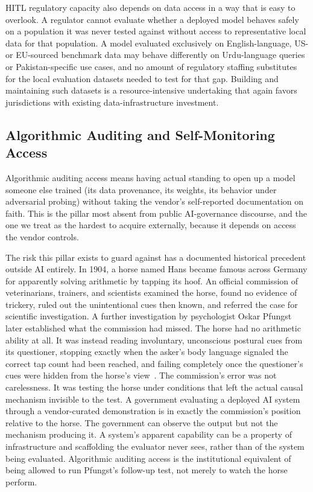 \documentclass{ieeeaccess}
\begin{document}
HITL regulatory capacity also depends on data access in a way that is easy to overlook. A regulator cannot evaluate whether a deployed model behaves safely on a population it was never tested against without access to representative local data for that population. A model evaluated exclusively on English-language, US- or EU-sourced benchmark data may behave differently on Urdu-language queries or Pakistan-specific use cases, and no amount of regulatory staffing substitutes for the local evaluation datasets needed to test for that gap.
Building and maintaining such datasets is a resource-intensive undertaking that again favors jurisdictions with existing data-infrastructure investment.

\subsection{Algorithmic Auditing and Self-Monitoring Access}

Algorithmic auditing access means having actual standing to open up a model someone else trained (its data provenance, its weights, its behavior under adversarial probing) without taking the vendor's self-reported documentation on faith. This is the pillar most absent from public AI-governance discourse, and the one we treat as the hardest to acquire externally, because it depends on access the vendor controls.

The risk this pillar exists to guard against has a documented historical precedent outside AI entirely. In 1904, a horse named Hans became famous across Germany for apparently solving arithmetic by tapping its hoof. An official commission of veterinarians, trainers, and scientists examined the horse, found no evidence of trickery, ruled out the unintentional cues then known, and referred the case for scientific investigation. A further investigation by psychologist Oskar Pfungst later established what the commission had missed. The horse had no arithmetic ability at all. It was instead reading involuntary, unconscious postural cues from its questioner, stopping exactly when the asker's body language signaled the correct tap count had been reached, and failing completely once the questioner's cues were hidden from the horse's view~\cite{pfungst1911cleverhans}.
The commission's error was not carelessness. It was testing the horse under conditions that left the actual causal mechanism invisible to the test. A government evaluating a deployed AI system through a vendor-curated demonstration is in exactly the commission's position relative to the horse. The government can observe the output but not the mechanism producing it. A system's apparent capability can be a property of infrastructure and scaffolding the evaluator never sees, rather than of the system being evaluated. Algorithmic auditing access is the institutional equivalent of being allowed to run Pfungst's follow-up test, not merely to watch the horse perform.
\end{document}
